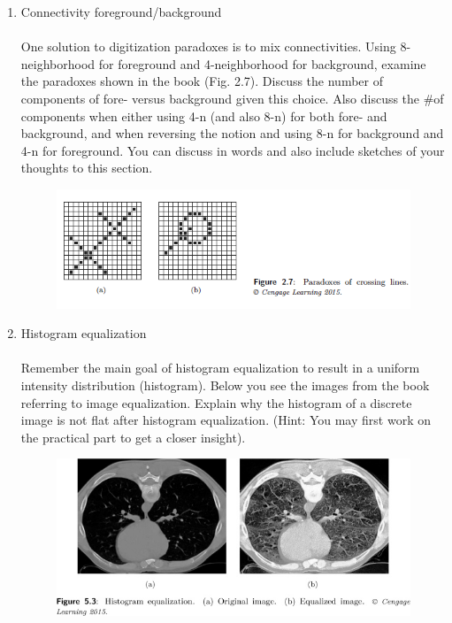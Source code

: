 \documentclass{article}
\begin{document}
\begin{enumerate}[label=A\arabic*)]
		
	\item Connectivity foreground/background 
		\\
		\\
		One solution to digitization paradoxes is to mix connectivities. Using 8-neighborhood for foreground and 4-neighborhood for background, examine the paradoxes shown in the book (Fig. 2.7). Discuss the number of components of fore- versus background given this choice. Also discuss the \#of components when either using 4-n (and also 8-n) for both fore- and background, and when reversing the notion and using 8-n for background and 4-n for foreground. You can discuss in words and also include sketches of your thoughts to this section.
		\begin{figure}[h!]
			\centering
			\includegraphics[width=\linewidth-20em]{img-1.png}
		\end{figure}
	\item Histogram equalization
		\\
		\\
		Remember the main goal of histogram equalization to result in a uniform intensity distribution (histogram). Below you see the images from the book referring to image equalization. Explain why the histogram of a discrete image is not flat after histogram equalization. (Hint: You may first work on the practical part to get a closer insight).
		\begin{figure}[h!]
			\begin{minipage}{0.48\textwidth}
				\centering
				\includegraphics[width=.9\linewidth]{img-2.png}

\end{minipage}
\end{figure}
\end{enumerate}
\end{document}
